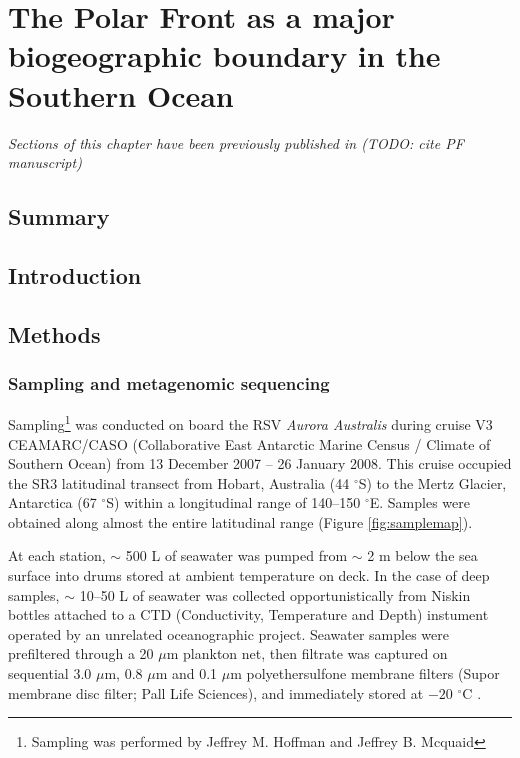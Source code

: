 \chapter{The Polar Front as a major biogeographic boundary in the Southern Ocean} 
\label{ch:polarfront}

\emph{Sections of this chapter have been previously published in (TODO: cite PF manuscript)}

\section{Summary}

\section{Introduction}


\section{Methods}
\subsection{Sampling and metagenomic sequencing}

Sampling\footnote{Sampling was performed by Jeffrey M. Hoffman and Jeffrey B. Mcquaid} was conducted on board the RSV \emph{Aurora Australis} during cruise V3 CEAMARC/CASO (Collaborative East Antarctic Marine Census / Climate of Southern Ocean) from 13 December 2007 -- 26 January 2008. 
This cruise occupied the SR3 latitudinal transect from Hobart, Australia (44 $^\circ$S) to the Mertz Glacier, Antarctica (67 $^\circ$S) within a longitudinal range of 140--150 $^\circ$E.
Samples were obtained along almost the entire latitudinal range (Figure \ref{fig:samplemap}).



At each station, $\sim$ 500 L of seawater was pumped from $\sim$ 2 m below the sea surface into drums stored at ambient temperature on deck. 
In the case of deep samples, $\sim$ 10--50 L of seawater was collected opportunistically from Niskin bottles attached to a CTD (Conductivity, Temperature and Depth) instument operated by an unrelated oceanographic project.
Seawater samples were prefiltered through a 20 $\mu$m plankton net, then filtrate was captured on sequential 3.0 $\mu$m, 0.8 $\mu$m and 0.1 $\mu$m polyethersulfone membrane filters (Supor membrane disc filter; Pall Life Sciences), and immediately stored at $-20$ $^\circ$C \cite{Rusch:2007ez,Ng:2010cd}.


